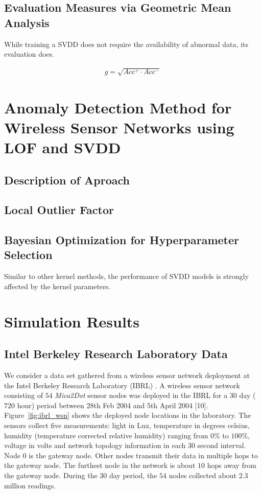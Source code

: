 \documentclass[journal,transmag,times]{IEEEtran}
\begin{document}
\subsection{Evaluation Measures via Geometric Mean Analysis}

While training a SVDD does not require the availability of abnormal data, its evaluation does. 

\begin{align}
g = \sqrt{Acc^+ \cdot Acc^-}
\end{align}

\section{Anomaly Detection Method for Wireless Sensor Networks using LOF and SVDD}

\subsection{Description of Aproach}

\subsection{Local Outlier Factor}



\subsection{Bayesian Optimization for Hyperparameter Selection}

Similar to other kernel methods, the performance of SVDD models is strongly affected by the kernel parameters.

\section{Simulation Results}

\cite{Suthaharan2010}

\subsection{Intel Berkeley Research Laboratory Data}

We consider a data set gathered from a wireless sensor network deployment at the Intel Berkeley Research Laboratory (IBRL) \cite{Buonadonna2005}. A wireless sensor network consisting of $54$ \emph{Mica2Dot} sensor nodes was deployed in the IBRL for a $30$ day ($720$ hour) period between 28th Feb 2004 and 5th April 2004 [10]. Figure~\ref{fig:ibrl_wsn} shows the deployed node locations in the laboratory. The sensors collect five measurements: light in Lux, temperature in degrees celsius, humidity (temperature corrected relative humidity) ranging from $0\%$ to $100\%$, voltage in volts and network topology information in each $30$ second interval. Node $0$ is the gateway node. Other nodes transmit their data in multiple hops to the gateway node. The furthest node in the network is about $10$ hops away from the gateway node. During the $30$ day period, the $54$ nodes collected about $2.3$ million readings.
\end{document}
